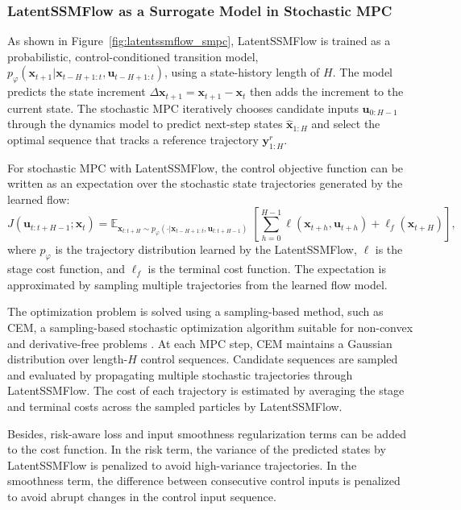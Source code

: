 \subsubsection{LatentSSMFlow as a Surrogate Model in Stochastic MPC}
As shown in Figure~\ref{fig:latentssmflow_smpc}, LatentSSMFlow is trained as a probabilistic, control-conditioned transition model, $p_\varphi\left(\mathbf{x}_{t+1}|\boldsymbol{x}_{t-H+1:t},\boldsymbol{u}_{t-H+1:t}\right)$, using a state-history length of $H$. The model predicts the state increment $\Delta\mathbf{x}_{t+1}=\mathbf{x}_{t+1}-\mathbf{x}_t$ then adds the increment to the current state. The stochastic \ac{MPC} iteratively chooses candidate inputs $\boldsymbol{u}_{0:H-1}$ through the dynamics model to predict next-step states $\hat{\boldsymbol{x}}_{1:H}$ and select the optimal sequence that tracks a reference trajectory $\boldsymbol{y}^r_{1:H}$. 

For stochastic MPC with LatentSSMFlow, the control objective function can be written as an expectation over the stochastic state trajectories generated by the learned flow:
\begin{equation}
    J(\boldsymbol{u}_{t:t+H-1};\boldsymbol{x}_t)
    =\mathbb{E}_{\boldsymbol{x}_{t:t+H}\sim
    p_\varphi(\cdot|\boldsymbol{x}_{t-H+1:t},\boldsymbol{u}_{t:t+H-1})}
    \;\left[
    \sum_{h=0}^{H-1}
    \ell(\boldsymbol{x}_{t+h},\boldsymbol{u}_{t+h})
    +\ell_f(\boldsymbol{x}_{t+H})
    \right],
    \label{eq:stochastic_mpc_objective}
\end{equation}
where $p_\varphi$ is the trajectory distribution learned by the LatentSSMFlow, $\ell$ is the stage cost function, and $\ell_f$ is the terminal cost function. The expectation is approximated by sampling multiple trajectories from the learned flow model. 

The optimization problem is solved using a sampling-based method, such as \ac{CEM}, a sampling-based stochastic optimization algorithm suitable for non-convex and derivative-free problems \citep{rubinstein1999cem}. At each MPC step, CEM maintains a Gaussian distribution over length-$H$ control sequences. Candidate sequences are sampled and evaluated by propagating multiple stochastic trajectories through LatentSSMFlow. The cost of each trajectory is estimated by averaging the stage and terminal costs across the sampled particles by LatentSSMFlow.

Besides, risk-aware loss and input smoothness regularization terms can be added to the cost function. In the risk term, the variance of the predicted states by LatentSSMFlow is penalized to avoid high-variance trajectories. In the smoothness term, the difference between consecutive control inputs is penalized to avoid abrupt changes in the control input sequence.

